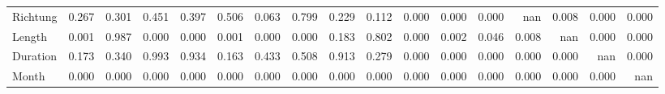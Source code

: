 \begin{tabular}{lrrrrrrrrrrrrrrrr}
Richtung & 0.267 & 0.301 & 0.451 & 0.397 &  0.506 &  0.063 & 0.799 &  0.229 &  0.112 & 0.000 & 0.000 &   0.000 &       nan &   0.008 &     0.000 &  0.000 \\
Length   & 0.001 & 0.987 & 0.000 & 0.000 &  0.001 &  0.000 & 0.000 &  0.183 &  0.802 & 0.000 & 0.002 &   0.046 &     0.008 &     nan &     0.000 &  0.000 \\
Duration & 0.173 & 0.340 & 0.993 & 0.934 &  0.163 &  0.433 & 0.508 &  0.913 &  0.279 & 0.000 & 0.000 &   0.000 &     0.000 &   0.000 &       nan &  0.000 \\
Month    & 0.000 & 0.000 & 0.000 & 0.000 &  0.000 &  0.000 & 0.000 &  0.000 &  0.000 & 0.000 & 0.000 &   0.000 &     0.000 &   0.000 &     0.000 &    nan \\
\bottomrule
\end{tabular}
